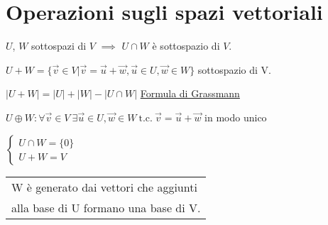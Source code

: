 \section{Operazioni sugli spazi vettoriali}
$U$, $W$ sottospazi di $V$ $\implies$ $U \cap W$ è sottospazio di $V$.

$U+W = \{\vec{v} \in V | \vec{v} = \vec{u} + \vec{w}, \vec{u} \in U, \vec{w} \in W\}$ sottospazio di V.

$|U+W| = |U| + |W| - |U \cap W|$ \underline{Formula di Grassmann}

\vspace{0.6em}

$U \oplus W: \forall \vec{v} \in V\ \exists \vec{u} \in U, \vec{w} \in W\ \text{t.c.}\ \vec{v} = \vec{u} + \vec{w}$ in modo unico

\(
\begin{cases}
U \cap W = \{0\} \\[0em]
U + W = V
\end{cases}
\)
\begin{tabular}{@{}l@{}}
	W è generato dai vettori che aggiunti \\ alla base di U formano una base di V.
\end{tabular}